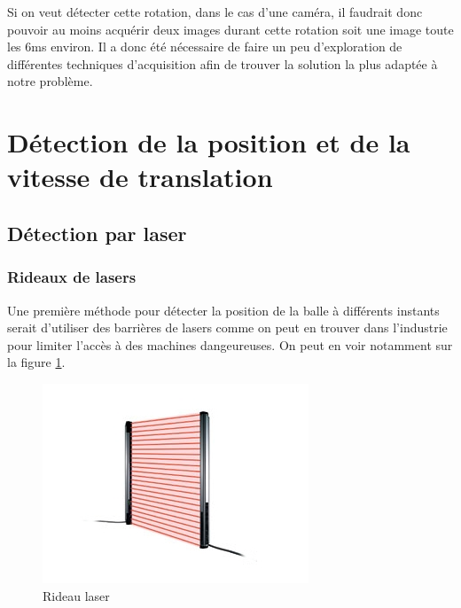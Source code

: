 Si on veut détecter cette rotation, dans le cas d'une caméra, il faudrait donc pouvoir au moins acquérir deux images durant cette rotation soit une image toute les 6ms environ. Il a donc été nécessaire de faire un peu d'exploration de différentes techniques d'acquisition afin de trouver la solution la plus adaptée à notre problème.













\section{Détection de la position et de la vitesse de translation}



\subsection{Détection par laser}

\subsubsection{Rideaux de lasers}

Une première méthode pour détecter la position de la balle à différents instants serait d'utiliser des barrières de lasers comme on peut en trouver dans l'industrie pour limiter l'accès à des machines dangeureuses. On peut en voir notamment sur la figure \ref{img_rideaulasers}.

\begin{figure}[h]
\begin{center}
\includegraphics[width=\textwidth]{rideaulaser.png}
\caption{Rideau laser}
\label{img_rideaulasers}
\end{center}
\end{figure}

